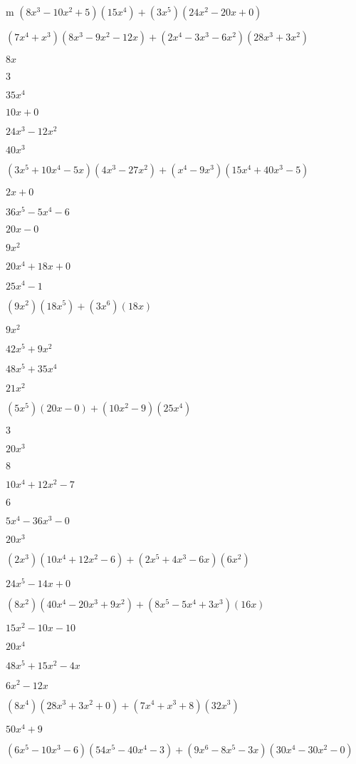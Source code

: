 \documentclass{article}
\begin{document}
\begin{multicols}{2}
m $(8x^{3}-10x^2+5)(15x^{4})+(3x^{5})(24x^{2}-20x+0)$\item $(7x^{4}+x^{3})(8x^{3}-9x^{2}-12x)+(2x^{4}-3x^{3}-6x^2)(28x^{3}+3x^{2})$\item $8x$\item $3$\item $35x^{4}$\item $10x+0$\item $24x^{3}-12x^{2}$\item $40x^{3}$\item $(3x^{5}+10x^{4}-5x)(4x^{3}-27x^{2})+(x^{4}-9x^{3})(15x^{4}+40x^{3}-5)$\item $2x+0$\item $36x^{5}-5x^{4}-6$\item $20x-0$\item $9x^{2}$\item $20x^{4}+18x+0$\item $25x^{4}-1$\item $(9x^2)(18x^{5})+(3x^{6})(18x)$\item $9x^{2}$\item $42x^{5}+9x^{2}$\item $48x^{5}+35x^{4}$\item $21x^{2}$\item $(5x^{5})(20x-0)+(10x^2-9)(25x^{4})$\item $3$\item $20x^{3}$\item $8$\item $10x^{4}+12x^{2}-7$\item $6$\item $5x^{4}-36x^{3}-0$\item $20x^{3}$\item $(2x^{3})(10x^{4}+12x^{2}-6)+(2x^{5}+4x^{3}-6x)(6x^{2})$\item $24x^{5}-14x+0$\item $(8x^2)(40x^{4}-20x^{3}+9x^{2})+(8x^{5}-5x^{4}+3x^{3})(16x)$\item $15x^{2}-10x-10$\item $20x^{4}$\item $48x^{5}+15x^{2}-4x$\item $6x^{2}-12x$\item $(8x^{4})(28x^{3}+3x^{2}+0)+(7x^{4}+x^{3}+8)(32x^{3})$\item $50x^{4}+9$\item $(6x^{5}-10x^{3}-6)(54x^{5}-40x^{4}-3)+(9x^{6}-8x^{5}-3x)(30x^{4}-30x^{2}-0)$\item 
\end{multicols}
\end{document}
